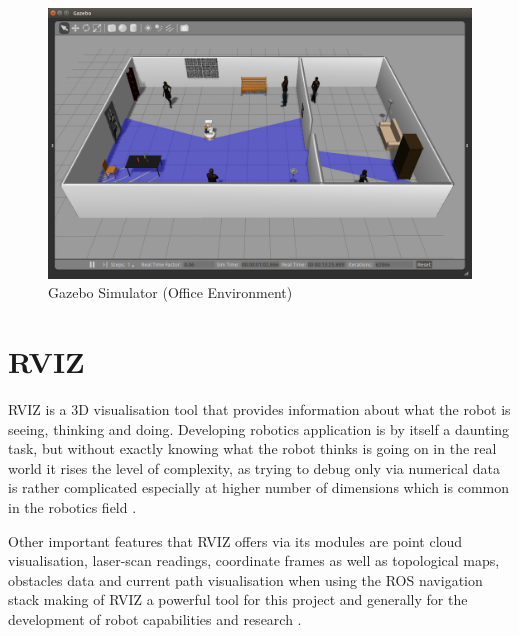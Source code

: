 \begin{figure}[!htbp]
\begin{center}
\includegraphics[width=\linewidth]{images/gazebo_screenshot2.png}
\end{center}
\caption{Gazebo Simulator (Office Environment)}
\label{fig:gazebo_screenshot2}
\end{figure}

\section{RVIZ}

RVIZ is a 3D visualisation tool that provides information about what the robot is seeing, thinking and doing. Developing robotics application is by itself a daunting task, but without exactly knowing what the robot thinks is going on in the real world it rises the level of complexity, as trying to debug only via numerical data is rather complicated especially at higher number of dimensions which is common in the robotics field \cite{website:RVIZ}. 

Other important features that RVIZ offers via its modules are point cloud visualisation, laser-scan readings, coordinate frames as well as topological maps, obstacles data and current path visualisation when using the ROS navigation stack making of RVIZ a powerful tool for this project and generally for the development of robot capabilities and research \cite{website:RVIZ}.

